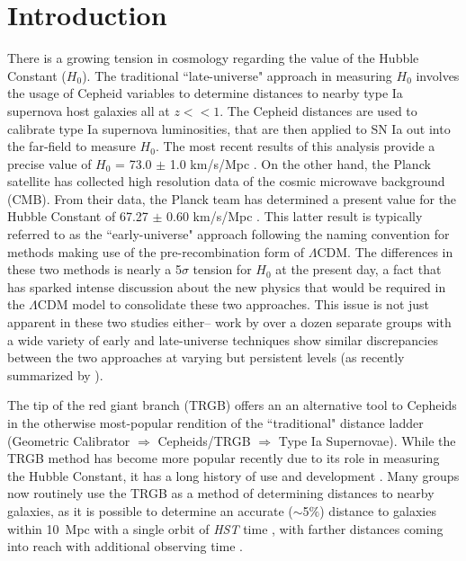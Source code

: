 \documentclass[twocolumn]{aastex62}
\begin{document}
\section{Introduction} \label{sec:intro}
There is a growing tension in cosmology regarding the value of the Hubble Constant ($H_{0}$). The traditional ``late-universe" approach in measuring $H_{0}$ involves the usage of Cepheid variables to determine distances to nearby type Ia supernova host galaxies all at $z<<1$. The Cepheid distances are used to calibrate type Ia supernova luminosities, that are then applied to SN Ia out into the far-field to measure $H_{0}$. The most recent results of this analysis provide a precise value of $H_{0}$ = 73.0 $\pm$ 1.0 km/s/Mpc \citep{2021arXiv211204510R}. On the other hand, the Planck satellite has collected high resolution data of the cosmic microwave background (CMB). From their data, the Planck team has determined a present value for the Hubble Constant of 67.27 $\pm$ 0.60 km/s/Mpc \citep{2020A&A...641A...6P}. This latter result is typically referred to as the ``early-universe" approach following the naming convention for methods making use of the pre-recombination form of $\Lambda$CDM. The differences in these two methods is nearly a 5$\sigma$ tension for $H_{0}$ at the present day, a fact that has sparked intense discussion about the new physics that would be required in the $\Lambda$CDM model to consolidate these two approaches. This issue is not just apparent in these two studies either-- work by over a dozen separate groups with a wide variety of early and late-universe techniques show similar discrepancies between the two approaches at varying but persistent levels (as recently summarized by \citealt{2021arXiv210301183D}). 

The tip of the red giant branch (TRGB) offers an an alternative tool to Cepheids in the otherwise most-popular rendition of the ``traditional" distance ladder (Geometric Calibrator $\Rightarrow$ Cepheids/TRGB $\Rightarrow$ Type Ia Supernovae). While the TRGB method has become more popular recently due to its role in measuring the Hubble Constant, it has a long history of use and development \citep{1993ApJ...417..553L,2002AJ....124..213M, 2007ApJ...661..815R,2009ApJ...690..389M}. Many groups now routinely use the TRGB as a method of determining distances to nearby galaxies, as it is possible to determine an accurate ($\sim$5$\%$) distance to galaxies within 10~Mpc with a single orbit of \textit{HST} time \citep{2019ApJ...880...52A,2020ApJ...888...31H,2021arXiv210108270B}, with farther distances coming into reach with additional observing time \citep{2017AJ....154...51M,2020ApJ...895L...4D,2021MNRAS.501.3621A,2021ApJ...914L..12S}.
\end{document}
